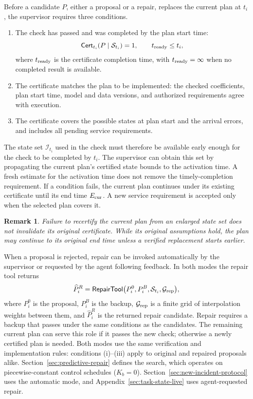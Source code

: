 \documentclass[final]{cas-sc}
\theoremstyle{definition}
\theoremstyle{plain}
\newtheorem{remark}{Remark}
\theoremstyle{definition}
\theoremstyle{plain}
\newcommand{\appref}[1]{Appendix~\ref{#1}}
\begin{document}
Before a candidate $P$, either a proposal or a repair, replaces the
current plan at $t_i$, the supervisor requires three conditions.
\begin{enumerate}
\renewcommand{\labelenumi}{(\roman{enumi})}
\item The check has passed and was completed by the plan start time:
\[
\mathsf{Cert}_{t_i}(P\mid\mathcal S_{t_i})=1,\qquad
t_{\rm ready}\le t_i,
\]
where $t_{\rm ready}$ is the certificate completion time, with
$t_{\rm ready}=\infty$ when no completed result is available.
\item The certificate matches the plan to be implemented: the checked
coefficients, plan start time, model and data versions, and
authorized requirements agree with execution.
\item The certificate covers the possible states at plan start and
the arrival errors, and includes all pending service requirements.
\end{enumerate}
The state set $\mathcal I_{t_i}$ used in the check must therefore be
available early enough for the check to be completed by $t_i$. The
supervisor can obtain this set by propagating the current plan's
certified state bounds to the activation time. A fresh estimate for
the activation time does not remove the timely-completion requirement. If a condition fails, the current plan
continues under its existing certificate until its end time
$E_{\rm cur}$. A new service requirement is accepted only when the
selected plan covers it.

\begin{remark}
\label{rem:recertification}
Failure to recertify the current plan from an enlarged state set does
not invalidate its original certificate. While its original
assumptions hold, the plan may continue to its original end time
unless a verified replacement starts earlier.
\end{remark}

When a proposal is rejected, repair can be invoked automatically by
the supervisor or requested by the agent following feedback. In both
modes the repair tool returns
\begin{equation}
\widehat P_i^{R}=\mathsf{RepairTool}\big(P_i^{0},P_i^{B},
\mathcal S_{t_i},\mathcal G_{\rm rep}\big),
\label{eq:repair-tool-interface}
\end{equation}
where $P_i^{0}$ is the proposal, $P_i^{B}$ is the backup,
$\mathcal G_{\rm rep}$ is a finite grid of interpolation weights
between them, and $\widehat P_i^{R}$ is the returned repair candidate.
Repair requires a backup that passes under the same conditions as the
candidates. The remaining current plan can serve this role if it
passes the new check; otherwise a newly certified plan is needed. Both
modes use the same verification and implementation rules:
conditions (i)--(iii) apply to original and repaired proposals alike.
Section~\ref{sec:predictive-repair} defines the search, which operates on
piecewise-constant control schedules ($K_b=0$).
Section~\ref{sec:new-incident-protocol} uses the automatic mode, and
\appref{sec:task-state-live} uses agent-requested repair.
\end{document}
